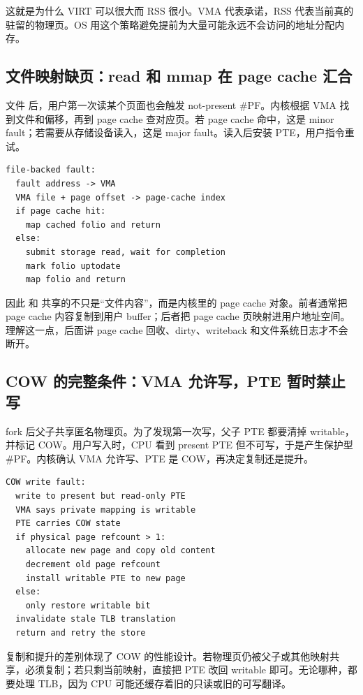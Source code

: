 这就是为什么 VIRT 可以很大而 RSS 很小。VMA 代表承诺，RSS 代表当前真的驻留的物理页。OS 用这个策略避免提前为大量可能永远不会访问的地址分配内存。

\subsection{文件映射缺页：read 和 mmap 在 page cache 汇合}

文件  后，用户第一次读某个页面也会触发 not-present \#PF。内核根据 VMA 找到文件和偏移，再到 page cache 查对应页。若 page cache 命中，这是 minor fault；若需要从存储设备读入，这是 major fault。读入后安装 PTE，用户指令重试。

\begin{lstlisting}
file-backed fault:
  fault address -> VMA
  VMA file + page offset -> page-cache index
  if page cache hit:
    map cached folio and return
  else:
    submit storage read, wait for completion
    mark folio uptodate
    map folio and return
\end{lstlisting}

因此  和  共享的不只是“文件内容”，而是内核里的 page cache 对象。前者通常把 page cache 内容复制到用户 buffer；后者把 page cache 页映射进用户地址空间。理解这一点，后面讲 page cache 回收、dirty、writeback 和文件系统日志才不会断开。

\subsection{COW 的完整条件：VMA 允许写，PTE 暂时禁止写}

fork 后父子共享匿名物理页。为了发现第一次写，父子 PTE 都要清掉 writable，并标记 COW。用户写入时，CPU 看到 present PTE 但不可写，于是产生保护型 \#PF。内核确认 VMA 允许写、PTE 是 COW，再决定复制还是提升。

\begin{lstlisting}
COW write fault:
  write to present but read-only PTE
  VMA says private mapping is writable
  PTE carries COW state
  if physical page refcount > 1:
    allocate new page and copy old content
    decrement old page refcount
    install writable PTE to new page
  else:
    only restore writable bit
  invalidate stale TLB translation
  return and retry the store
\end{lstlisting}

复制和提升的差别体现了 COW 的性能设计。若物理页仍被父子或其他映射共享，必须复制；若只剩当前映射，直接把 PTE 改回 writable 即可。无论哪种，都要处理 TLB，因为 CPU 可能还缓存着旧的只读或旧的可写翻译。

